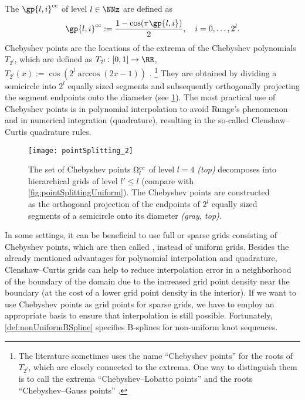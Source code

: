 %
The  $\gp{l,i}^\clenshawcurtis$ of level $l \in \NNz$
are defined as
\begin{equation}
  \gp{l,i}^\clenshawcurtis
  := \frac{1 - \cos(\pi \gp{l,i})}{2},\quad
  i = 0, \dotsc, 2^l.
\end{equation}
Chebyshev points are the locations of the extrema of the
Chebyshev polynomials $T_{2^l}$, which are defined as
$T_{2^l}\colon [0, 1] \to \RR$,
$T_{2^l}(x) := \cos(2^l \arccos(2x - 1))$ \cite{Xu16Chebyshev}.%
\footnote{%
  The literature sometimes uses the name ``Chebyshev points'' for
  the roots of $T_{2^l}$, which are closely connected to the extrema.
  One way to distinguish them is to call the extrema
  ``Chebyshev--Lobatto points'' and the roots
  ``Chebyshev--Gauss points'' \cite{Xu16Chebyshev}.%
}
They are obtained by dividing a semicircle into $2^l$ equally sized
segments and subsequently orthogonally projecting the
segment endpoints onto the diameter
(see \cref{fig:pointSplittingChebyshev}).
The most practical use of Chebyshev points is in
polynomial interpolation to avoid Runge's phenomenon and in
numerical integration (quadrature), resulting in the
so-called Clenshaw--Curtis quadrature rules.

\begin{figure}
  \texttt{[image: pointSplitting\_2]}%
  \caption{%
    The set of Chebyshev points $\Omega_l^{\mathrm{cc}}$ of level
    $l = 4$ \emph{(top)}
    decomposes into hierarchical grids of level $l' \le l$
    (compare with \cref{fig:pointSplittingUniform}).
    The Chebyshev points are constructed as
    the orthogonal projection of the
    endpoints of $2^l$ equally sized segments
    of a semicircle onto its diameter \emph{\textcolor{C8}{(gray, top)}}.%
  }
  \label{fig:pointSplittingChebyshev}
\end{figure}

In some settings, it can be beneficial to use full or sparse grids consisting
of Chebyshev points, which are then called ,
instead of uniform grids.
Besides the already mentioned advantages for polynomial interpolation and
quadrature, Clenshaw--Curtis grids can help to reduce interpolation
error in a neighborhood of the boundary of the domain due to the increased
grid point density near the boundary
(at the cost of a lower grid point density in the interior).
If we want to use Chebyshev points as grid points for sparse grids,
we have to employ an appropriate basis to ensure that interpolation
is still possible.
Fortunately, \cref{def:nonUniformBSpline} specifies B-splines for non-uniform
knot sequences.

